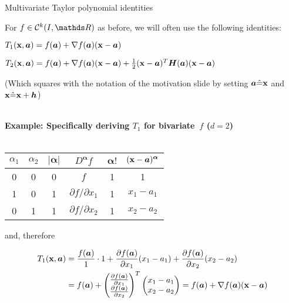\documentclass[11pt,compress,t,notes=noshow, xcolor=table]{beamer}
\begin{document}
\begin{frame2}{Multivariate Taylor polynomial identities}

For $f \in \mathcal{C}^k(I,\R)$ as before, we will often use the following identities: \begin{itemizeM}
    \item $T_1(\mathbf{x},\bm{a})=f(\bm{a}) + \nabla f(\bm{a}) (\mathbf{x} - \bm{a})$
    \item $T_2(\mathbf{x},\bm{a})=f(\bm{a}) + \nabla f(\bm{a}) (\mathbf{x} - \bm{a}) + \frac{1}{2}(\mathbf{x} - \bm{a})^T\bm{H}(\bm{a})(\mathbf{x} - \bm{a})$
\end{itemizeM}
({\footnotesize Which squares with the notation of the motivation slide by setting $\bm{a}\hat{=}\mathbf{x}$ and $\mathbf{x}\hat{=}\mathbf{x}+\bm{h}$})\\\,

\textbf{Example: Specifically deriving $T_1$ for bivariate~$f$ ($d=2$)}\\\,

    \begin{tabular}{c|c||c|c|c|c}
        $\alpha_1$ & $\alpha_2$ & $|\bm{\alpha}|$ & $D^{\bm{\alpha}} f$ & $\bm{\alpha}!$ & $(\mathbf{x}-\bm{a})^{\bm{\alpha}}$ \\ \hline\hline
        0 & 0 & 0 & $f$                         & 1 & 1          \\ \hline
        1 & 0 & 1 & $\partial f / \partial x_1$ & 1 & $x_1-a_1$  \\ \hline
        0 & 1 & 1 & $\partial f / \partial x_2$ & 1 & $x_2-a_2$
    \end{tabular} and, therefore

\begin{align*}
    T_1(\mathbf{x},\bm{a}) &= \frac{f(\bm{a})}{1} \cdot 1 + \frac{\partial f(\bm{a})}{\partial x_1} (x_1 - a_1) + \frac{\partial f(\bm{a})}{\partial x_2} (x_2 - a_2) \\
    &= f(\bm{a}) + \begin{pmatrix}\frac{\partial f(\bm{a})}{\partial x_1} \\ \frac{\partial f(\bm{a})}{\partial x_2}\end{pmatrix}^T \begin{pmatrix}x_1 - a_1 \\ x_2 - a_2\end{pmatrix} = f(\bm{a}) + \nabla f(\bm{a}) (\mathbf{x} - \bm{a})
\end{align*}

\end{frame2}
\end{document}
